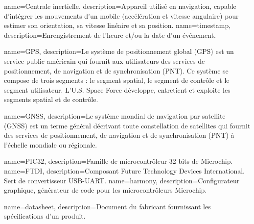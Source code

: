 
{
	name=Centrale inertielle,
	description={Appareil utilisé en navigation, capable d'intégrer les mouvements d'un mobile (accélération et vitesse angulaire) pour estimer son orientation, sa vitesse linéaire et sa position.}
}
{
	name=timestamp,
	description={Enrengistrement de l'heure et/ou la date d'un événement.}
}

{
	name=GPS,
	description={Le système de positionnement global (GPS) est un service public américain qui fournit aux utilisateurs des services de positionnement, de navigation et de synchronisation (PNT). Ce système se compose de trois segments : le segment spatial, le segment de contrôle et le segment utilisateur. L'U.S. Space Force développe, entretient et exploite les segments spatial et de contrôle.}
}

{
	name=GNSS,
	description={Le système mondial de navigation par satellite (GNSS) est un terme général décrivant toute constellation de satellites qui fournit des services de positionnement, de navigation et de synchronisation (PNT) à l'échelle mondiale ou régionale.}
}

{
	name=PIC32,
	description={Famille de microcontrôleur 32-bits de Microchip.}
}
{
	name=FTDI,
	description={Composant Future Technology Devices International. Sert de convertisseur USB-UART.}
}
{
	name=harmony,
	description={Configurateur graphique, générateur de code pour les microcontrôleurs Microchip.}
}

{
	name=datasheet,
	description={Document du fabricant fournissant les spécifications d'un produit.}
}





